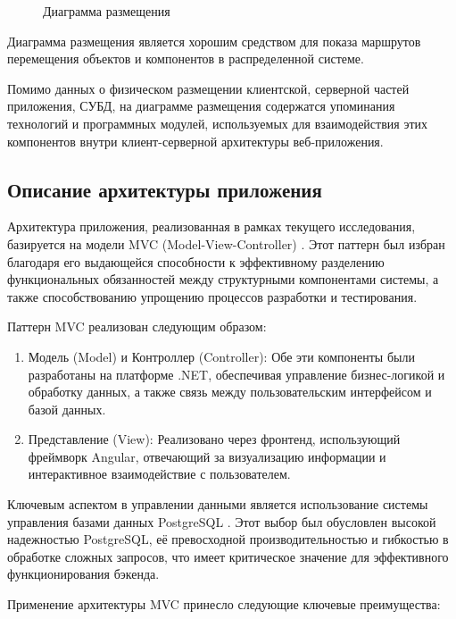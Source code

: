 \begin{figure}[ht]
\caption{Диаграмма размещения}
\label{place:image}
\end{figure}

Диаграмма размещения является хорошим средством для показа маршрутов перемещения объектов и компонентов в распределенной системе.

Помимо данных о физическом размещении клиентской, серверной частей приложения, СУБД, на диаграмме размещения содержатся упоминания технологий и программных модулей, используемых для взаимодействия этих компонентов внутри клиент-серверной архитектуры веб-приложения.

\subsection{Описание архитектуры приложения}

Архитектура приложения, реализованная в рамках текущего исследования, базируется на модели MVC (Model-View-Controller) \cite{kofman}. Этот паттерн был избран благодаря его выдающейся способности к эффективному разделению функциональных обязанностей между структурными компонентами системы, а также способствованию упрощению процессов разработки и тестирования.

Паттерн MVC реализован следующим образом:

\begin{enumerate}
    \item Модель (Model) и Контроллер (Controller): Обе эти компоненты были разработаны на платформе .NET, обеспечивая управление бизнес-логикой и обработку данных, а также связь между пользовательским интерфейсом и базой данных.
    \item Представление (View): Реализовано через фронтенд, использующий фреймворк Angular, отвечающий за визуализацию информации и интерактивное взаимодействие с пользователем.
\end{enumerate}

Ключевым аспектом в управлении данными является использование системы управления базами данных PostgreSQL \cite{kofman}. Этот выбор был обусловлен высокой надежностью PostgreSQL, её превосходной производительностью и гибкостью в обработке сложных запросов, что имеет критическое значение для эффективного функционирования бэкенда.

Применение архитектуры MVC принесло следующие ключевые преимущества:

